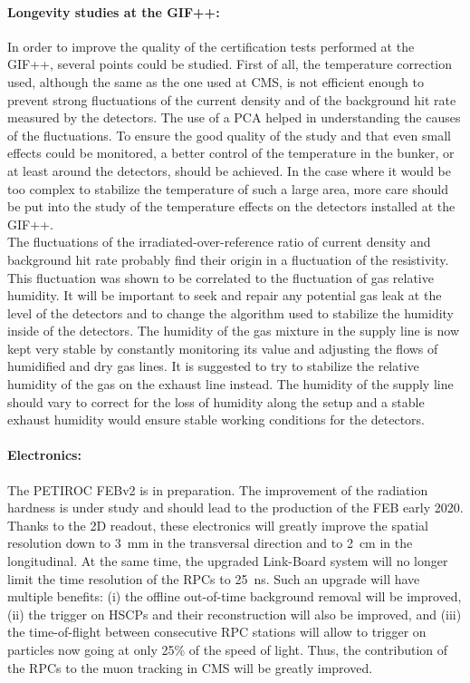 	\paragraph*{Longevity studies at the GIF++:} In order to improve the quality of the certification tests performed at the GIF++, several points could be studied. First of all, the temperature correction used, although the same as the one used at CMS, is not efficient enough to prevent strong fluctuations of the current density and of the background hit rate measured by the detectors. The use of a \acl{PCA} helped in understanding the causes of the fluctuations. To ensure the good quality of the study and that even small effects could be monitored, a better control of the temperature in the bunker, or at least around the detectors, should be achieved. In the case where it would be too complex to stabilize the temperature of such a large area, more care should be put into the study of the temperature effects on the detectors installed at the GIF++.\\
	The fluctuations of the irradiated-over-reference ratio of current density and background hit rate probably find their origin in a fluctuation of the resistivity. This fluctuation was shown to be correlated to the fluctuation of gas relative humidity. It will be important to seek and repair any potential gas leak at the level of the detectors and to change the algorithm used to stabilize the humidity inside of the detectors. The humidity of the gas mixture in the supply line is now kept very stable by constantly monitoring its value and adjusting the flows of humidified and dry gas lines. It is suggested to try to stabilize the relative humidity of the gas on the exhaust line instead. The humidity of the supply line should vary to correct for the loss of humidity along the setup and a stable exhaust humidity would ensure stable working conditions for the detectors.
	
	\paragraph*{Electronics:} The PETIROC FEBv2 is in preparation. The improvement of the radiation hardness is under study and should lead to the production of the FEB early 2020. Thanks to the 2D readout, these electronics will greatly improve the spatial resolution down to \SI{3}{mm} in the transversal direction and to \SI{2}{cm} in the longitudinal. At the same time, the upgraded Link-Board system will no longer limit the time resolution of the RPCs to \SI{25}{ns}. Such an upgrade will have multiple benefits: (i) the offline out-of-time background removal will be improved, (ii) the trigger on HSCPs and their reconstruction will also be improved, and (iii) the time-of-flight between consecutive RPC stations will allow to trigger on particles now going at only 25\% of the speed of light. Thus, the contribution of the RPCs to the muon tracking in CMS will be greatly improved.
	
